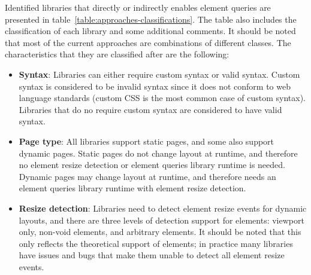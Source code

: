 \documentclass[a4paper,11pt]{kth-mag}
\begin{document}
    Identified libraries that directly or indirectly enables element queries are presented in table~\ref{table:approaches-classifications}.
    The table also includes the classification of each library and some additional comments.
    It should be noted that most of the current approaches are combinations of different classes.
    The characteristics that they are classified after are the following:
    \begin{itemize}
      \item \textbf{Syntax}:  Libraries can either require custom syntax or valid syntax.
                              Custom syntax is considered to be invalid syntax since it does not conform to \gls{web} language standards (custom \gls{CSS} is the most common case of custom syntax).
                              Libraries that do no require custom syntax are considered to have valid syntax.
      \item \textbf{Page type}: All libraries support static pages, and some also support dynamic pages.
                                Static pages do not change layout at runtime, and therefore no \gls{element} resize detection or element queries library runtime is needed.
                                Dynamic pages may change layout at runtime, and therefore needs an element queries library runtime with \gls{element} resize detection.
      \item \textbf{Resize detection}:  Libraries need to detect \gls{element} resize events for dynamic layouts, and there are three levels of detection support for elements: \gls{viewport} only, non-void \glspl{element}, and arbitrary \glspl{element}.
                                        It should be noted that this only reflects the theoretical support of \glspl{element}; in practice many libraries have issues and bugs that make them unable to detect all \gls{element} resize events.
    \end{itemize}
    
\end{document}
